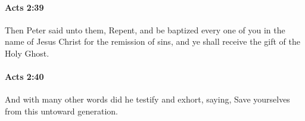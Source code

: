 		\paragraph{Acts 2:39} %
			\label{ACTS-2-39}

			Then Peter said unto them, Repent, and be baptized every one of you in the name of Jesus Christ for the remission of sins, and ye shall receive the gift of the Holy Ghost.

			\begin{framed}
			\scriptsize
				\begin{compactdesc}
					\item[SBLG] 
				\end{compactdesc}
			\end{framed}

		\paragraph{Acts 2:40} %
			\label{ACTS-2-40}

			And with many other words did he testify and exhort, saying, Save yourselves from this untoward generation.

